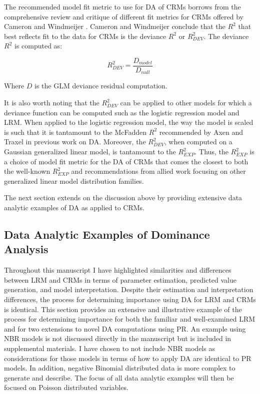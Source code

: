 \documentclass[ShortAfour,times,sageapa]{sagej}
\begin{document}
	The recommended model fit metric to use for DA of CRMs borrows from the comprehensive review and critique of different fit metrics for CRMs offered by Cameron and Windmeijer \cite{cameron1996r}.
	Cameron and Windmeijer conclude that the $R^2$ that best reflects fit to the data for CRMs is the deviance $R^2$ or $R^{2}_{DEV}$.
	The deviance $R^2$ is computed as:
	
	$$R^{2}_{DEV} = \frac{D_{model}}{D_{null}}$$
	
	Where $D$ is the GLM deviance residual computation.
	
	It is also worth noting that the $R^2_{DEV}$ can be applied to other models for which a deviance function can be computed such as the logistic regression model and LRM.  
	When applied to the logistic regression model, the way the model is scaled is such that it is tantamount to the McFadden $R^2$ recommended by Axen and Traxel \cite{azen2009using} in previous work on DA.
	Moreover, the $R^2_{DEV}$, when computed on a Gaussian generalized linear model, is tantamount to the $R^2_{EXP}$.
	Thus, the $R^2_{EXP}$ is a choice of model fit metric for the DA of CRMs that comes the closest to both the well-known $R^2_{EXP}$ and recommendations from allied work focusing on other generalized linear model distribution families.
	
	The next section extends on the discussion above by providing extensive data analytic examples of DA as applied to CRMs. 
	
	\subsection{Data Analytic Examples of Dominance Analysis}
	
	Throughout this manuscript I have highlighted similarities and differences between LRM and CRMs in terms of parameter estimation, predicted value generation, and model interpretation.
	Despite their estimation and interpretation differences, the process for determining importance using DA for LRM and CRMs is identical.
	This section provides an extensive and illustrative example of the process for determining importance for both the familiar and well-examined LRM and for two extensions to novel DA computations using PR.
	An example using NBR models is not discussed directly in the manuscript but is included in supplemental materials.
	I have chosen to not include NBR models as considerations for those models in terms of how to apply DA are identical to PR models.
	In addition, negative Binomial distributed data is more complex to generate and describe.
	The focus of all data analytic examples will then be focused on Poisson distributed variables.
	
\end{document}

